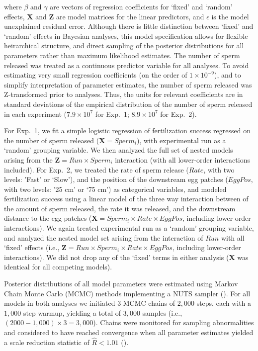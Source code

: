 \documentclass{article}
\begin{document}
	\noindent where $\beta$ and $\gamma$ are vectors of regression coefficients for `fixed' and `random' effects, $\mathbf{X}$ and $\mathbf{Z}$ are model matrices for the linear predictors, and $\epsilon$ is the model unexplained residual error. Although there is little distinction between `fixed' and `random' effects in Bayesian analyses, this model specification allows for flexible heirarchical structure, and direct sampling of the posterior distributions for all parameters rather than maximum likelihood estimates. The number of sperm released was treated as a continuous predictor variable for all analyses. To avoid estimating very small regression coefficients (on the order of $1 \times 10^{-9}$), and to simplify interpretation of parameter estimates, the number of sperm released was Z-transformed prior to analyses. Thus, the units for relevant coefficients are in standard deviations of the empirical distribution of the number of sperm released in each experiment ($7.9 \times 10^{7}$ for Exp.~1; $8.9 \times 10^{7}$ for Exp.~2). 

	For Exp.~1, we fit a simple logistic regression of fertilization success regressed on the number of sperm released ($\mathbf{X} = Sperm_i$), with experimental run as a `random' grouping variable. We then analyzed the full set of nested models arising from the $\mathbf{Z} = Run \times Sperm_i$ interaction (with all lower-order interactions included). For Exp.~2, we treated the rate of sperm release ($Rate$, with two levels: 'Fast' or `Slow'), and the position of the downstream egg patches ($EggPos$, with two levels: '25 cm' or `75 cm') as categorical variables, and modeled fertilization success using a linear model of the three way interaction between of the amount of sperm released, the rate it was released, and the downstream distance to the egg patches ($ \mathbf{X} = Sperm_i \times Rate \times EggPos$, including lower-order interactions). We again treated experimental run as a `random' grouping variable, and analyzed the nested model set arising from the interaction of $Run$ with all `fixed' effects (i.e., $\mathbf{Z} = Run \times Sperm_i \times Rate \times EggPos$, including lower-order interactions). We did not drop any of the `fixed' terms in either analysis ($\mathbf{X}$ was identical for all competing models).

	Posterior distributions of all model parameters were estimated using Markov Chain Monte Carlo (MCMC) methods implementing a NUTS sampler (\citealt{Stan2016}). For all models in both analyses we initiated $3$ MCMC chains of $2,000$ steps, each with a $1,000$ step warmup, yielding a total of $3,000$ samples (i.e., $(2000 - 1,000) \times 3 = 3,000$). Chains were monitored for sampling abnormalities and considered to have reached convergence when all parameter estimates yielded a scale reduction statistic of $\hat{R} < 1.01$ (\citealt{GelmanRubin1992}).
\end{document}
